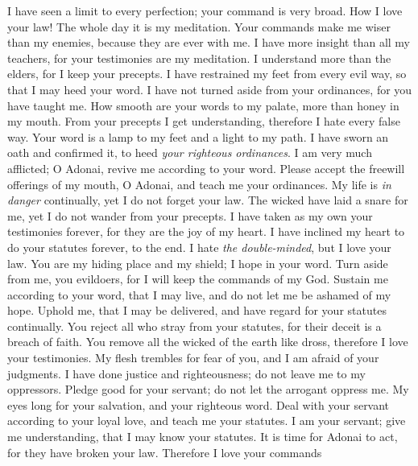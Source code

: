 \begin{biblechapter}
\verse I have seen a limit to every perfection; 
your command is very broad.
 How I love your law! 
The whole day it is my meditation.
\verse Your commands make me wiser than my enemies, 
because they are ever with me.
\verse I have more insight than all my teachers, 
for your testimonies are my meditation.
\verse I understand more than the elders, 
for I keep your precepts.
\verse I have restrained my feet from every evil way, 
so that I may heed your word.
\verse I have not turned aside from your ordinances, 
for you have taught me.
\verse How smooth are your words to my palate, 
more than honey in my mouth.
\verse From your precepts I get understanding, 
therefore I hate every false way.
 Your word is a lamp to my feet 
and a light to my path.
\verse I have sworn an oath and confirmed it, 
to heed \textit{your righteous ordinances}.
\verse I am very much afflicted; 
O Adonai, revive me according to your word.
\verse Please accept the freewill offerings of my mouth, O Adonai, 
and teach me your ordinances.
\verse My life is \textit{in danger} continually, 
yet I do not forget your law.
\verse The wicked have laid a snare for me, 
yet I do not wander from your precepts.
\verse I have taken as my own your testimonies forever, 
for they are the joy of my heart.
\verse I have inclined my heart to do your statutes 
forever, to the end.
 I hate \textit{the double-minded}, 
but I love your law.
\verse You are my hiding place and my shield; 
I hope in your word.
\verse Turn aside from me, you evildoers, 
for I will keep the commands of my God.
\verse Sustain me according to your word, that I may live, 
and do not let me be ashamed of my hope.
\verse Uphold me, that I may be delivered, 
and have regard for your statutes continually.
\verse You reject all who stray from your statutes, 
for their deceit is a breach of faith.
\verse You remove all the wicked of the earth like dross, 
therefore I love your testimonies.
\verse My flesh trembles for fear of you, 
and I am afraid of your judgments.
 I have done justice and righteousness; 
do not leave me to my oppressors.
\verse Pledge good for your servant; 
do not let the arrogant oppress me.
\verse My eyes long for your salvation, 
and your righteous word.
\verse Deal with your servant according to your loyal love, 
and teach me your statutes.
\verse I am your servant; give me understanding, 
that I may know your statutes.
\verse It is time for Adonai to act, 
for they have broken your law.
\verse Therefore I love your commands 

\end{biblechapter}
